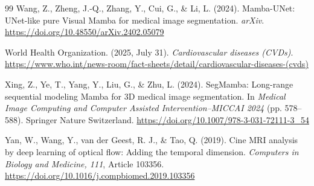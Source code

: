 \begin{thebibliography}{99}
Wang, Z., Zheng, J.-Q., Zhang, Y., Cui, G., \& Li, L. (2024). Mamba-UNet: UNet-like pure Visual Mamba for medical image segmentation. \textit{arXiv}. \url{https://doi.org/10.48550/arXiv.2402.05079}

World Health Organization. (2025, July 31). \textit{Cardiovascular diseases (CVDs)}. \url{https://www.who.int/news-room/fact-sheets/detail/cardiovascular-diseases-(cvds)}

Xing, Z., Ye, T., Yang, Y., Liu, G., \& Zhu, L. (2024). SegMamba: Long-range sequential modeling Mamba for 3D medical image segmentation. In \textit{Medical Image Computing and Computer Assisted Intervention--MICCAI 2024} (pp. 578--588). Springer Nature Switzerland. \url{https://doi.org/10.1007/978-3-031-72111-3_54}

Yan, W., Wang, Y., van der Geest, R. J., \& Tao, Q. (2019). Cine MRI analysis by deep learning of optical flow: Adding the temporal dimension. \textit{Computers in Biology and Medicine, 111}, Article 103356. \url{https://doi.org/10.1016/j.compbiomed.2019.103356}

\end{thebibliography}
